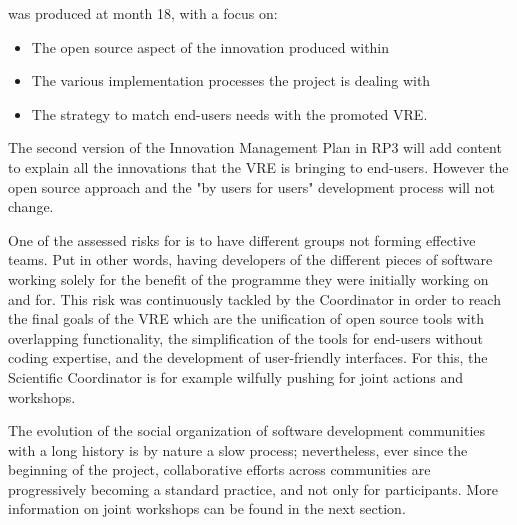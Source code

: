  was produced at month 18, with a focus on:

\begin{itemize}
\item{The open source aspect of the innovation produced within \ODK}
\item{The various implementation processes the project is dealing with}
\item{The strategy to match end-users needs with the promoted VRE}.
\end{itemize}

The second version of the Innovation Management Plan in RP3 will add content
to explain all the innovations that the VRE is bringing to end-users.
However the open source approach and the "by users for users"
development process will not change.

One of the assessed risks for
\ODK is to have different groups not forming effective teams. Put in
other words, having developers of the different pieces of software
working solely for the benefit of the programme they were initially
working on and for. This risk was continuously tackled by the
Coordinator in order to reach the final goals of the VRE which are the
unification of open source tools with overlapping functionality, the
simplification of the tools for end-users without coding expertise,
and the development of user-friendly interfaces. For this, the
Scientific Coordinator is for example wilfully pushing for joint
actions and workshops.

The evolution of the social organization of software development
communities with a long history is by nature a slow process;
nevertheless, ever since the beginning of the project, collaborative
efforts across communities are progressively becoming a standard
practice, and not only for \ODK participants. More information on
joint workshops can be found in the next section.


